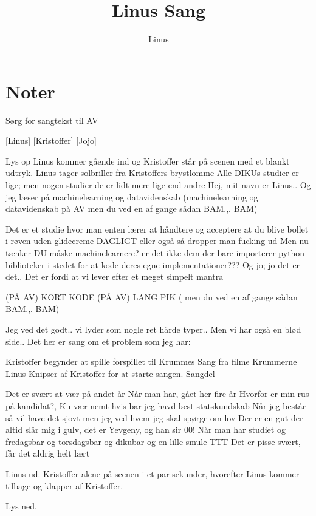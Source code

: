 \documentclass{article}
\title{Linus Sang}
\author{Linus}
\begin{document}
                
\maketitle
\section*{Noter}  
Sørg for sangtekst til AV
% 
\begin{roles}
[Linus]
[Kristoffer]
[Jojo]
\end{roles}

\begin{props}


\end{props}

\newpage%
\begin{sketch}

\scene Lys op
\scene Linus kommer gående ind og Kristoffer står på scenen med et blankt udtryk. Linus tager solbriller fra Kristoffers brystlomme
 Alle DIKUs studier er lige; men nogen studier de er lidt mere lige end andre
 Hej, mit navn er Linus..
 Og jeg læser på machinelearning og datavidenskab  
\scene(machinelearning og datavidenskab på AV men du ved en af gange sådan BAM.,. BAM)

 Det er et studie hvor man enten lærer at håndtere og acceptere at du blive bollet i røven uden glidecreme DAGLIGT  eller også så dropper man fucking ud
 Men nu tænker DU  måske machinelearnere? er det ikke dem der bare importerer python-biblioteker i stedet for at kode deres egne implementationer???
 Og jo;  jo det er det.. 
 Det er fordi at vi lever efter et meget simpelt mantra

\scene (PÅ AV) KORT KODE 
\scene (PÅ AV) LANG PIK
\scene ( men du ved en af gange sådan BAM.,. BAM)

 Jeg ved det godt.. vi lyder som nogle ret hårde typer..
 Men vi har også en blød side..
 Det her er sang om et problem som jeg har:

\scene Kristoffer begynder at spille forspillet til Krummes Sang fra filme Krummerne
\scene Linus Knipser af Kristoffer for at starte sangen. Sangdel


\begin{song}
 Det er svært at vær på andet år
Når man har, gået her fire år
Hvorfor er min rus på kandidat?, 
Ku vær nemt hvis bar jeg havd læst statskundskab
Når jeg består så vil have det sjovt
men jeg ved hvem jeg skal spørge om lov
Der er en gut der altid slår mig i gulv, 
det er Yevgeny, og han sir 
00!
Når man har studiet og fredagsbar og torsdagsbar
og dikubar og en lille smule TTT
Det er pisse svært,
får det aldrig helt lært
\end{song}  

\scene Linus ud. Kristoffer alene på scenen i et par sekunder, hvorefter Linus kommer tilbage og klapper af Kristoffer.





\scene Lys ned.


\end{sketch}
\end{document}
